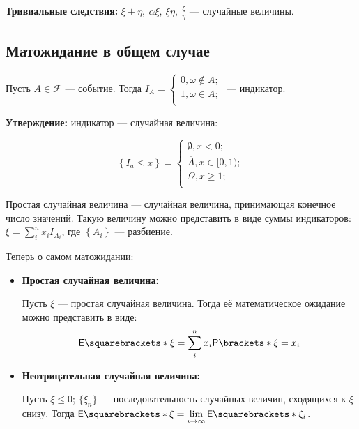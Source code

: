 \textbf{Тривиальные следствия:} $\xi + \eta,\ \alpha\xi,\ \xi\eta,\ \frac{\xi}{\eta}$ --- случайные
величины.

\subsection{Матожидание в общем случае}

\begin{definition}
    Пусть $A\in \mathcal{F}$ --- событие. Тогда $I_A = \begin{cases}
        0, \omega \not \in A;\\
        1, \omega \in A;\\
    \end{cases}$ --- индикатор.
\end{definition}

\textbf{Утверждение:} индикатор --- случайная величина:

\[
    \left\{ I_a \leq x \right\} = \begin{cases}
        \emptyset, x < 0;\\
        \overline{A}, x \in [0, 1);\\
        \Omega, x \geq 1;\\
    \end{cases}
\]

\begin{definition}
    Простая случайная величина --- случайная величина, принимающая конечное число значений. Такую величину
    можно представить в виде суммы индикаторов: $\xi = \sum\limits_{i}^{n}x_i I_{A_i}$, где $\left\{ A_i
    \right\}$ --- разбиение.
\end{definition}

Теперь о самом матожидании:

\begin{itemize}
    \item \textbf{Простая случайная величина:}

        Пусть $\xi$ --- простая случайная величина. Тогда её математическое ожидание можно представить в
        виде:
        \[
            \E{\xi} = \sum\limits_{i}^{n} x_i \Pr{\xi = x_i}
        \]

    \item \textbf{Неотрицательная случайная величина:}

        Пусть $\xi \leq 0$; $\{\xi_n\}$ --- последовательность случайных величин, сходящихся к $\xi$ снизу.
        Тогда $\E{\xi} = \lim\limits_{i \to \infty} \E{\xi_i}$.
\end{itemize}